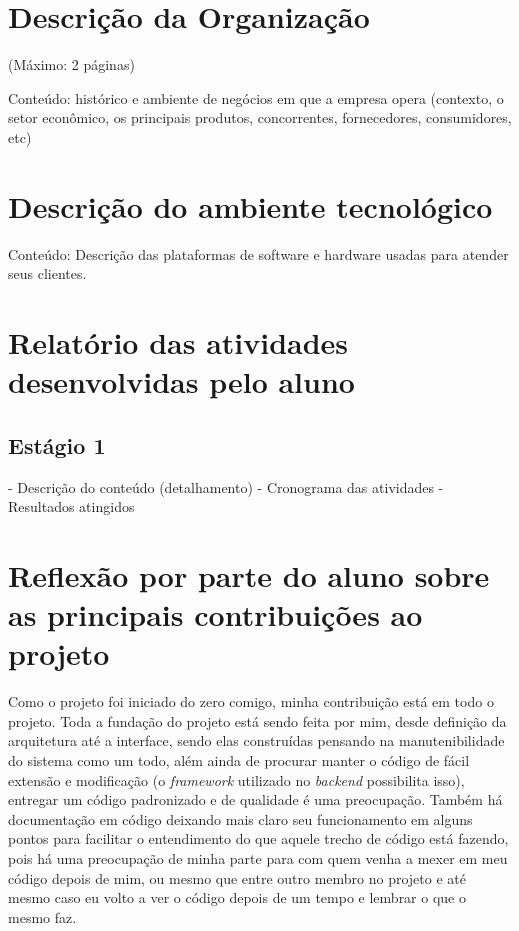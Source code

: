 \documentclass{ufscar}
\begin{document}
\section{Descrição da Organização}
(Máximo: 2 páginas)

Conteúdo: histórico e ambiente de negócios em  que a empresa opera (contexto, o setor econômico, os principais produtos, concorrentes, fornecedores, consumidores, etc)

\section{Descrição do ambiente tecnológico}
Conteúdo: Descrição das plataformas de software e hardware usadas para atender seus clientes.

\section{Relatório das atividades desenvolvidas pelo aluno}
\subsection{Estágio 1}
- Descrição do conteúdo (detalhamento)
- Cronograma das atividades
- Resultados atingidos


\section{Reflexão por parte do aluno sobre as principais contribuições ao projeto}
Como o projeto foi iniciado do zero comigo, minha contribuição está em todo o projeto. Toda a fundação do projeto está sendo feita por mim, desde definição da arquitetura até a interface, sendo elas construídas pensando na manutenibilidade do sistema como um todo, além ainda de procurar manter o código de fácil extensão e modificação (o \textit{framework} utilizado no \textit{backend} possibilita isso), entregar um código padronizado e de qualidade é uma preocupação. Também há documentação em código deixando mais claro seu funcionamento em alguns pontos para facilitar o entendimento do que aquele trecho de código está fazendo, pois há uma preocupação de minha parte para com quem venha a mexer em meu código depois de mim, ou mesmo que entre outro membro no projeto e até mesmo caso eu volto a ver o código depois de um tempo e lembrar o que o mesmo faz.
\end{document}
